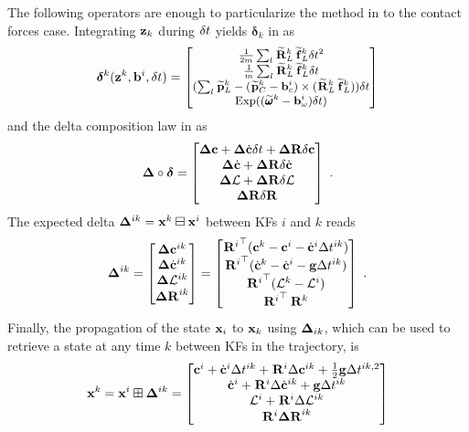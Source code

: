 The following operators are enough to particularize the  method in  to the contact forces case.
Integrating ${\bf z}_k$ during $\delta t$ yields $\bm\delta_k$ in  as
%
\begin{equation}
\small
    \bm\delta^{k}({\bf z}^k, {\bf b}^i, \delta t) =
    \begin{bmatrix}
    \frac{1}{2m} \sum_l \prescript{}{}{\widetilde{{\bf R}}}_{L}^k \prescript{}{}{\widetilde{{\bf f}}}_{L}^k \delta t^2
    \\
    \frac{1}{m} \sum_l \prescript{}{}{\widetilde{{\bf R}}}_{L}^k \prescript{}{}{\widetilde{{\bf f}}}_{L}^k \delta t 
    \\
    (\sum_l \prescript{}{}{\widetilde{{\bf p}}}_{L}^k - (\prescript{}{}{\widetilde{{\bf p}}}_{C}^k - {\bf b}_c^i) \times (\prescript{}{}{\widetilde{{\bf R}}}_{L}^k \prescript{}{}{\widetilde{{\bf f}}}_{L}^k ))\delta t
    \\
    \operatorname*{Exp}((\prescript{}{}{\widetilde{\pmb{\omega}}}_{}^k - {\bf b}_{\omega}^i)\delta t)
    \end{bmatrix}
\normalsize
\end{equation}
%
and the delta composition law in  as
%
\begin{equation}
    \D \circ \bm\delta = 
    \begin{bmatrix}
    \D\COM + \D\COMd \dt + \DR  \delta\COM
    \\
    \D\COMd + \DR  \delta \COMd
    \\
    \D\AM + \DR  \delta \AM
    \\
    \DR\dR
    \end{bmatrix}
    ~.
    \label{eq:DeltaDTCompo}
\end{equation}
%
The expected delta ${{\bm \Delta}}^{ik}={\bf x}^k\boxminus{\bf x}^i$ between KFs $i$ and $k$ reads
%
\begin{equation}
{{\bm \Delta}}^{ik} =
\begin{bmatrix}
   {{\bm \Delta}}{\bf c}^{ik} \\ {{\bm \Delta}}\dot{{\bf c}}^{ik} \\ {{\bm \Delta}}\mathcal{L}^{ik} \\ {\bm \Delta {\bf R}}^{ik}
\end{bmatrix}
=
\begin{bmatrix}
	{\prescript{}{}{{\bf R}}_{}^i}^{\top} ({\bf c}^k - {\bf c}^i - \dot{{\bf c}}^i \Delta t^{ik})
	\\
	{\prescript{}{}{{\bf R}}_{}^i}^{\top} (\dot{{\bf c}}^{k} - \dot{{\bf c}}^{i} - {\bf g} \Delta t^{ik})
	\\
	{\prescript{}{}{{\bf R}}_{}^i}^{\top} (\mathcal{L}^{k} - \mathcal{L}^{i})
	\\
    {\prescript{}{}{{\bf R}}_{}^i}^{\top} \prescript{}{}{{\bf R}}_{}^k
\end{bmatrix}
~.
\end{equation}
%
Finally, the propagation of the state ${\bf x}_i$ to ${\bf x}_k$ using ${{\bm \Delta}}_{ik}$, which can be used to retrieve a state at any time $k$ between KFs in the trajectory, is
%
\begin{equation}
	{\bf x}^k = {\bf x}^i \boxplus {{\bm \Delta}}^{ik} =
	\begin{bmatrix}
	{\bf c}^i + \dot{{\bf c}}^i \Delta t^{ik} + \prescript{}{}{{\bf R}}_{}^i \Delta {\bf c}^{ik} + \frac{1}{2} {\bf g} \Delta t^{ik,2}
	\\
	\dot{{\bf c}}^i + \prescript{}{}{{\bf R}}_{}^i \Delta \dot{{\bf c}}^{ik} + {\bf g} \Delta t^{ik}
	\\
	\mathcal{L}^i + \prescript{}{}{{\bf R}}_{}^i \Delta \mathcal{L}^{ik}
	\\
	\prescript{}{}{{\bf R}}_{}^i {\bm \Delta {\bf R}}^{ik}
	\end{bmatrix}
\end{equation}
%
%
%
%


